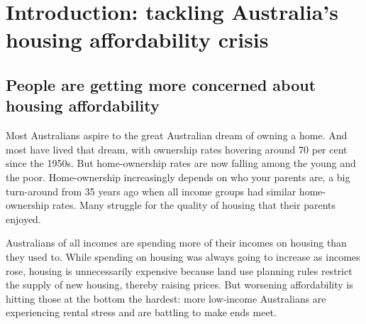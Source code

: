 \chapter{Introduction: tackling Australia's housing affordability crisis}\label{chap:introduction-addressing-australias-housing-affordability-problem}

\section{People are getting more concerned about housing affordability}\label{sec:public-concern-about-housing-affordability-is-increasing}

Most Australians aspire to the great Australian dream of owning a home.
And most have lived that dream, with ownership rates hovering around 70 per cent since the 1950s. But home-ownership rates are now falling among the young and the poor. Home-ownership increasingly depends on who your parents are, a big turn-around from 35 years ago when all income groups had similar home-ownership rates.
Many struggle for the quality of housing that their parents enjoyed.

Australians of all incomes are spending more of their incomes on housing than they used to. While spending on housing was always going to increase as incomes rose, housing is unnecessarily expensive because land use planning rules restrict the supply of new housing, thereby raising prices. But worsening affordability is hitting those at the bottom the hardest: more low-income Australians are experiencing rental stress and are battling to make ends meet.

